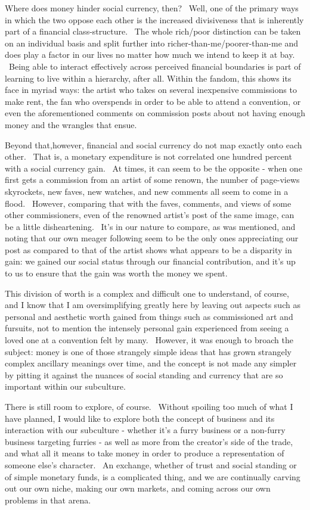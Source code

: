 Where does money hinder social currency, then? ~Well, one of the primary
ways in which the two oppose each other is the increased divisiveness
that is inherently part of a financial class-structure. ~The whole
rich/poor distinction can be taken on an individual basis and split
further into richer-than-me/poorer-than-me and does play a factor in our
lives no matter how much we intend to keep it at bay. ~Being able to
interact effectively across perceived financial boundaries is part of
learning to live within a hierarchy, after all. Within the fandom, this
shows its face in myriad ways: the artist who takes on several
inexpensive commissions to make rent, the fan who overspends in order to
be able to attend a convention, or even the aforementioned comments on
commission posts about not having enough money and the wrangles that
ensue.

Beyond that,however, financial and social currency do not map exactly
onto each other. ~That is, a monetary expenditure is not correlated one
hundred percent with a social currency gain. ~At times, it can seem to
be the opposite - when one first gets a commission from an artist of
some renown, the number of page-views skyrockets, new faves, new
watches, and new comments all seem to come in a flood. ~However,
comparing that with the faves, comments, and views of some other
commissioners, even of the renowned artist's post of the same image, can
be a little disheartening. ~It's in our nature to compare, as was
mentioned, and noting that our own meager following seem to be the only
ones appreciating our post as compared to that of the artist shows what
appears to be a disparity in gain: we gained our social status through
our financial contribution, and it's up to us to ensure that the gain
was worth the money we spent.

This division of worth is a complex and difficult one to understand, of
course, and I know that I am oversimplifying greatly here by leaving out
aspects such as personal and aesthetic worth gained from things such as
commissioned art and fursuits, not to mention the intensely personal
gain experienced from seeing a loved one at a convention felt by many.
~However, it was enough to broach the subject: money is one of those
strangely simple ideas that has grown strangely complex ancillary
meanings over time, and the concept is not made any simpler by pitting
it against the nuances of social standing and currency that are so
important within our subculture.

There is still room to explore, of course. ~Without spoiling too much of
what I have planned, I would like to explore both the concept of
business and its interaction with our subculture - whether it's a furry
business or a non-furry business targeting furries - as well as more
from the creator's side of the trade, and what all it means to take
money in order to produce a representation of someone else's character.
~An exchange, whether of trust and social standing or of simple monetary
funds, is a complicated thing, and we are continually carving out our
own niche, making our own markets, and coming across our own problems in
that arena.
